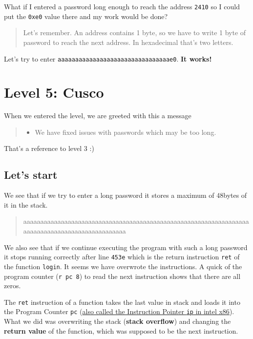 \documentclass[a4paper,11pt]{article}
\begin{document}
What if I entered a password long enough to reach the address
\texttt{2410} so I could put the \texttt{0xe0} value there and my work
would be done?

\begin{quote}
Let's remember. An address contains 1 byte, so we have to write 1 byte
of password to reach the next address. In hexadecimal that's two
letters.
\end{quote}

Let's try to enter \texttt{aaaaaaaaaaaaaaaaaaaaaaaaaaaaaaaae0}.
\textbf{It works!}

\section{Level 5: Cusco}\label{level-5-cusco}

When we entered the level, we are greeted with this a message

\begin{quote}
\begin{itemize}
\itemsep1pt\parskip0pt
\item
  We have fixed issues with passwords which may be too long.
\end{itemize}
\end{quote}

That's a reference to level 3 :)

\subsection{Let's start}\label{lets-start}

We see that if we try to enter a long password it stores a maximum of
48bytes of it in the stack.

\begin{quote}
aaaaaaaaaaaaaaaaaaaaaaaaaaaaaaaaaaaaaaaaaaaaaaaaaaaaaaaaaaaaaaaaaaaaaaaaaaaaaaaaaaaaaaaaaaaaaaaa
\end{quote}

We also see that if we continue executing the program with such a long
password it stops running correctly after line \texttt{453e} which is
the return instruction \texttt{ret} of the function \texttt{login}. It
seems we have overwrote the instructions. A quick of the program counter
(\texttt{r pc 8}) to read the next instruction shows that there are all
zeros.

The \texttt{ret} instruction of a function takes the last value in stack
and loads it into the Program Counter \texttt{pc}
(\href{http://en.wikipedia.org/wiki/Program_counter}{also called the
Instruction Pointer \texttt{ip} in intel x86}). What we did was
overwriting the stack (\textbf{stack overflow}) and changing the
\textbf{return value} of the function, which was supposed to be the next
instruction.
\end{document}
